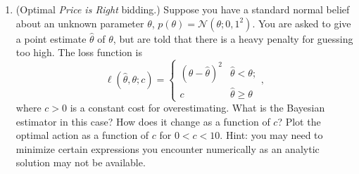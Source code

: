 \documentclass{article}
\newcommand{\mc}[1]{\mathcal{#1}}
\begin{document}
\begin{enumerate}
\item
  (Optimal \emph{Price is Right} bidding.)
  Suppose you have a standard normal belief about an unknown parameter
  $\theta$, $p(\theta) = \mc{N}(\theta; 0, 1^2)$.  You are asked to
  give a point estimate $\hat{\theta}$ of $\theta$, but are told that
  there is a heavy penalty for guessing too high.  The loss function is
  \begin{equation*}
    \ell(\hat{\theta}, \theta; c)
    =
    \begin{cases}
      (\theta - \hat{\theta})^2 & \hat{\theta}  <   \theta; \\
      c                         & \hat{\theta} \geq \theta
    \end{cases},
  \end{equation*}
  where $c > 0$ is a constant cost for overestimating.  What is the
  Bayesian estimator in this case?  How does it change as a function
  of $c$? Plot the optimal action as a function of $c$ for $0 < c <
  10$. Hint: you may need to minimize certain expressions you
  encounter numerically as an analytic solution may not be available.

\end{enumerate}
\end{document}
